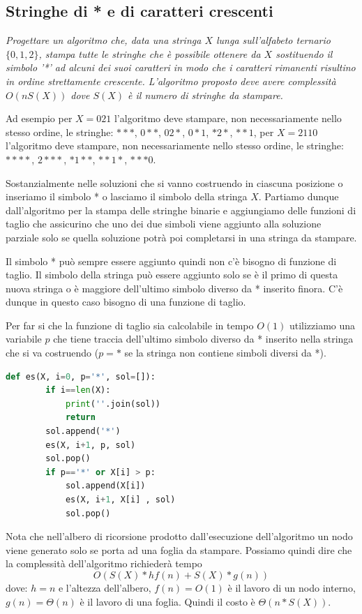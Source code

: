 \subsection{Stringhe di * e di caratteri crescenti}
\textit{Progettare un algoritmo che, data una stringa $X$ lunga sull'alfabeto ternario $\{0, 1, 2\}$, stampa tutte le stringhe che è possibile ottenere da $X$ sostituendo il simbolo '*' ad alcuni dei suoi caratteri in modo che i caratteri rimanenti risultino in ordine strettamente crescente. L'algoritmo proposto deve avere complessità $O(nS(X))$ dove $S(X)$ è il numero di stringhe da stampare.}

Ad esempio per $X =021$ l'algoritmo deve stampare, non necessariamente nello stesso ordine, le stringhe: $***$, $0**$, $02*$, $0*1$, $*2*$, $**1$, per $X=2110$ l'algoritmo deve stampare, non necessariamente nello stesso ordine, le stringhe: $****$, $2***$, $*1**$, $**1*$, $***0$.

Sostanzialmente nelle soluzioni che si vanno costruendo in ciascuna posizione o inseriamo il simbolo * o lasciamo il simbolo della stringa $X$. Partiamo dunque dall'algoritmo per la stampa delle stringhe binarie e aggiungiamo delle funzioni di taglio che assicurino che uno dei due simboli viene aggiunto alla soluzione parziale solo se quella soluzione potrà poi completarsi in una stringa da stampare.

Il simbolo * può sempre essere aggiunto quindi non c'è bisogno di funzione di taglio. Il simbolo della stringa può essere aggiunto solo se è il primo di questa nuova stringa o è maggiore dell'ultimo simbolo diverso da * inserito finora. C'è dunque in questo caso bisogno di una funzione di taglio.

Per far si che la funzione di taglio sia calcolabile in tempo $O(1)$ utilizziamo una variabile $p$ che tiene traccia dell'ultimo simbolo diverso da * inserito nella stringa che si va costruendo ($p = *$ se la stringa non contiene simboli diversi da *).

\begin{lstlisting}[language=Python]
    def es(X, i=0, p='*', sol=[]):
        if i==len(X):
            print(''.join(sol))
            return
        sol.append('*') 
        es(X, i+1, p, sol)
        sol.pop()
        if p=='*' or X[i] > p:
            sol.append(X[i])
            es(X, i+1, X[i] , sol)
            sol.pop()
\end{lstlisting}
Nota che nell'albero di ricorsione prodotto dall'esecuzione dell'algoritmo un nodo viene generato solo se porta ad una foglia da stampare. Possiamo quindi dire che la complessità dell'algoritmo richiederà tempo
\begin{equation*}
    O(S(X) * hf(n) + S(X) * g(n))    
\end{equation*}
dove: $h =n$ e l'altezza dell'albero, $f(n) = O(1)$ è il lavoro di un nodo interno, $g(n) = \Theta(n)$ è il lavoro di una foglia. Quindi il costo è $\Theta(n*S(X))$.

